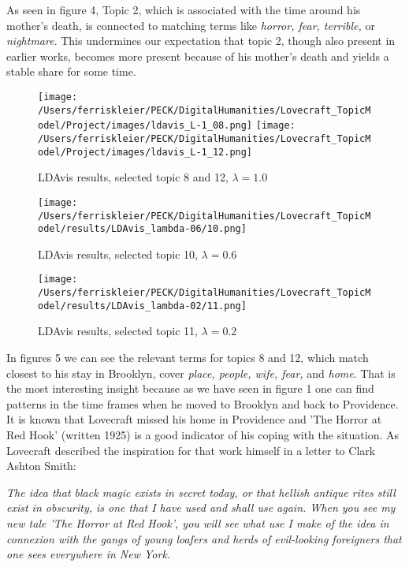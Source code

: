 As seen in figure 4, Topic 2, which is associated with the time around his mother’s death, is 
connected to matching terms like \textit{horror, fear, terrible,} or \textit{nightmare}. This undermines our expectation 
that topic 2, though also present in earlier works, becomes more present because of his mother's death 
and yields a stable share for some time.\\

\begin{figure}[p]
    \centering
    \texttt{[image: /Users/ferriskleier/PECK/DigitalHumanities/Lovecraft\_TopicModel/Project/images/ldavis\_L-1\_08.png]}
    \texttt{[image: /Users/ferriskleier/PECK/DigitalHumanities/Lovecraft\_TopicModel/Project/images/ldavis\_L-1\_12.png]}
    \caption{LDAvis results, selected topic 8 and 12, $\lambda=1.0$}
    \label{fig:mesh5}
\end{figure}

\begin{figure}[p]
    \centering
    \texttt{[image: /Users/ferriskleier/PECK/DigitalHumanities/Lovecraft\_TopicModel/results/LDAvis\_lambda-06/10.png]}
    \caption{LDAvis results, selected topic 10, $\lambda=0.6$}
    \label{fig:mesh6}
\end{figure}

\begin{figure}[ht]
    \centering
    \texttt{[image: /Users/ferriskleier/PECK/DigitalHumanities/Lovecraft\_TopicModel/results/LDAvis\_lambda-02/11.png]}
    \caption{LDAvis results, selected topic 11, $\lambda=0.2$}
    \label{fig:mesh7}
\end{figure}

In figures 5 we can see the relevant terms for topics 8 and 12, which match closest to his stay 
in Brooklyn, cover \textit{place, people, wife, fear,} and \textit{home}. That is the most interesting insight because 
as we have seen in figure 1 one can find patterns in the time frames when he moved to Brooklyn and 
back to Providence. It is known that Lovecraft missed his home in Providence and 'The Horror at 
Red Hook' (written 1925) is a good indicator of his coping with the situation. As Lovecraft 
described the inspiration for that work himself in a letter to Clark Ashton Smith:

\begin{displayquote}
    \textit{The idea that black magic exists in secret today, or that hellish antique rites still exist in obscurity, is one that I have used and shall use again. When you see my new tale 'The Horror at Red Hook', you will see what use I make of the idea in connexion with the gangs of young loafers and herds of evil-looking foreigners that one sees everywhere in New York.}
\end{displayquote}

